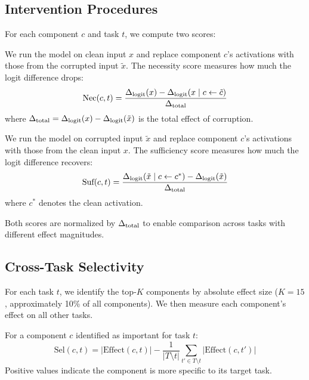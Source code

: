 \subsection{Intervention Procedures}
\label{sec:interventions}

For each component $c$ and task $t$, we compute two scores:

 We run the model on clean input $x$ and replace component $c$'s activations with those from the corrupted input $\tilde{x}$. The necessity score measures how much the logit difference drops:
\begin{equation}
    \text{Nec}(c, t) = \frac{\Delta_{\text{logit}}(x) - \Delta_{\text{logit}}(x \mid c \leftarrow \tilde{c})}{\Delta_{\text{total}}}
    \label{eq:necessity}
\end{equation}
where $\Delta_{\text{total}} = \Delta_{\text{logit}}(x) - \Delta_{\text{logit}}(\tilde{x})$ is the total effect of corruption.

 We run the model on corrupted input $\tilde{x}$ and replace component $c$'s activations with those from the clean input $x$. The sufficiency score measures how much the logit difference recovers:
\begin{equation}
    \text{Suf}(c, t) = \frac{\Delta_{\text{logit}}(\tilde{x} \mid c \leftarrow c^*) - \Delta_{\text{logit}}(\tilde{x})}{\Delta_{\text{total}}}
    \label{eq:sufficiency}
\end{equation}
where $c^*$ denotes the clean activation.

Both scores are normalized by $\Delta_{\text{total}}$ to enable comparison across tasks with different effect magnitudes.

\subsection{Cross-Task Selectivity}
\label{sec:selectivity}

For each task $t$, we identify the top-$K$ components by absolute effect size ($K = 15$, approximately 10\% of all components). We then measure each component's effect on all other tasks.

 For a component $c$ identified as important for task $t$:
\begin{equation}
    \text{Sel}(c, t) = |\text{Effect}(c, t)| - \frac{1}{|T \setminus t|} \sum_{t' \in T \setminus t} |\text{Effect}(c, t')|
    \label{eq:selectivity}
\end{equation}
Positive values indicate the component is more specific to its target task.

